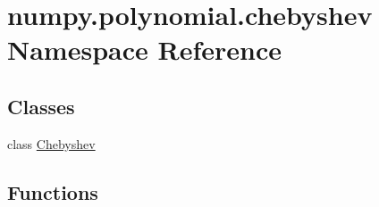 \hypertarget{namespacenumpy_1_1polynomial_1_1chebyshev}{}\section{numpy.\+polynomial.\+chebyshev Namespace Reference}
\label{namespacenumpy_1_1polynomial_1_1chebyshev}
\subsection*{Classes}
\begin{DoxyCompactItemize}
\item 
class \hyperlink{classnumpy_1_1polynomial_1_1chebyshev_1_1Chebyshev}{Chebyshev}
\end{DoxyCompactItemize}
\subsection*{Functions}
